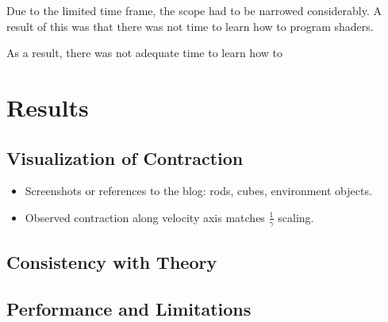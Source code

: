 \documentclass[a4paper]{article}
\begin{document}
Due to the limited time frame, the scope had to be narrowed considerably. A result of this was that there was not time to learn how to program shaders.

As a result, there was not adequate time to learn how to 


\section{Results}
\subsection{Visualization of Contraction}
\begin{itemize}
  \item Screenshots or references to the blog: rods, cubes, environment objects.
  \item Observed contraction along velocity axis matches $\tfrac{1}{\gamma}$ scaling.
\end{itemize}


\subsection{Consistency with Theory}

\subsection{Performance and Limitations}
\end{document}
